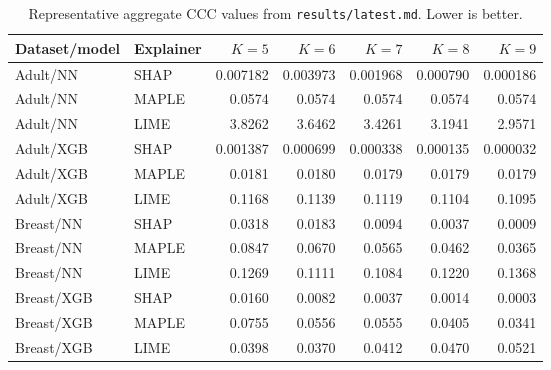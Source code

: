 \documentclass[sigconf,nonacm]{acmart}
\begin{document}
\begin{table}[t]
  \centering
  \caption{Representative aggregate CCC values from
  \texttt{results/latest.md}. Lower is better.}
  \label{tab:ccc-results}
  \begin{tabular}{llrrrrr}
    \toprule
    Dataset/model & Explainer & $K=5$ & $K=6$ & $K=7$ & $K=8$ & $K=9$ \\
    \midrule
    Adult/NN & SHAP   & 0.007182 & 0.003973 & 0.001968 & 0.000790 & 0.000186 \\
    Adult/NN & MAPLE  & 0.0574 & 0.0574 & 0.0574 & 0.0574 & 0.0574 \\
    Adult/NN & LIME   & 3.8262 & 3.6462 & 3.4261 & 3.1941 & 2.9571 \\
    Adult/XGB & SHAP  & 0.001387 & 0.000699 & 0.000338 & 0.000135 & 0.000032 \\
    Adult/XGB & MAPLE & 0.0181 & 0.0180 & 0.0179 & 0.0179 & 0.0179 \\
    Adult/XGB & LIME  & 0.1168 & 0.1139 & 0.1119 & 0.1104 & 0.1095 \\
    Breast/NN & SHAP   & 0.0318 & 0.0183 & 0.0094 & 0.0037 & 0.0009 \\
    Breast/NN & MAPLE  & 0.0847 & 0.0670 & 0.0565 & 0.0462 & 0.0365 \\
    Breast/NN & LIME   & 0.1269 & 0.1111 & 0.1084 & 0.1220 & 0.1368 \\
    Breast/XGB & SHAP  & 0.0160 & 0.0082 & 0.0037 & 0.0014 & 0.0003 \\
    Breast/XGB & MAPLE & 0.0755 & 0.0556 & 0.0555 & 0.0405 & 0.0341 \\
    Breast/XGB & LIME  & 0.0398 & 0.0370 & 0.0412 & 0.0470 & 0.0521 \\
    \bottomrule
  \end{tabular}
\end{table}
\end{document}
